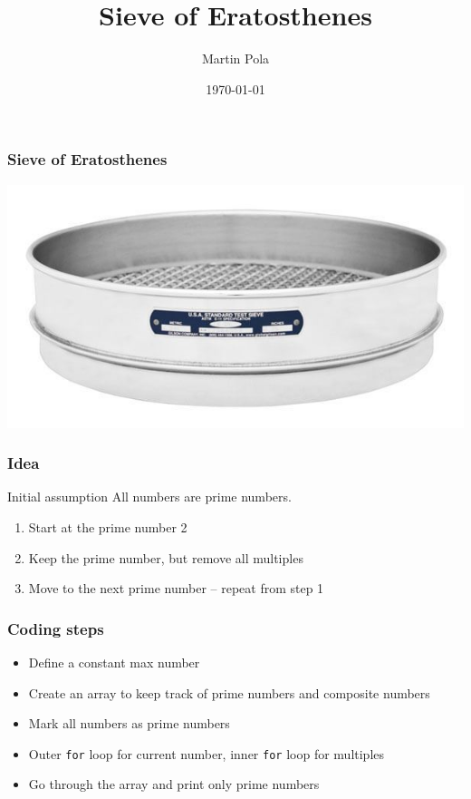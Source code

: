 \documentclass{beamer}
\begin{document}
	\title{Sieve of Eratosthenes}
	\author{Martin Pola}
	\date{\today}

    \frame
    {
        \frametitle{Sieve of Eratosthenes}

        \includegraphics[width=\textwidth]{sieves.jpg}
    }
    
    \frame
    {
        \frametitle{Idea}

        \begin{block}{Initial assumption}
           All numbers are prime numbers.
        \end{block}

        \vspace{0.5cm}
        
        \begin{enumerate}
            \item Start at the prime number 2
            \item Keep the prime number, but remove all multiples
            \item Move to the next prime number -- repeat from step 1
        \end{enumerate}
    }
    
    \frame
    {
        \frametitle{Coding steps}
        
        \begin{itemize}
            \item Define a constant max number
            \item Create an array to keep track of prime numbers and composite numbers
            \item Mark all numbers as prime numbers
            \item Outer \texttt{for} loop for current number, inner \texttt{for} loop for multiples
            \item Go through the array and print only prime numbers
        \end{itemize}
    }
\end{document}
